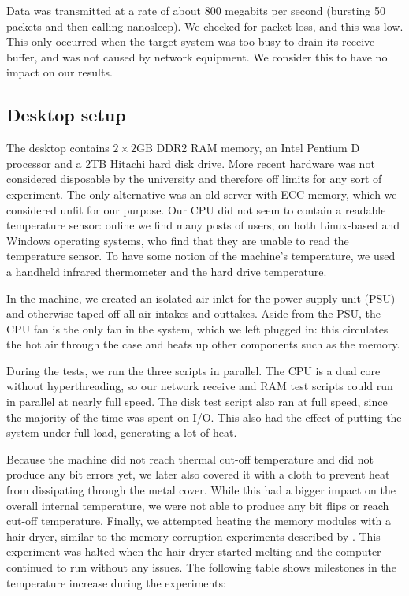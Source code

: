 \documentclass[conference]{IEEEtran}
\begin{document}
Data was transmitted at a rate of about 800 megabits per second (bursting 50
packets and then calling nanosleep). We checked for packet loss, and this was
low. This only occurred when the target system was too busy to drain its
receive buffer, and was not caused by network equipment. We consider this to
have no impact on our results.

\subsection{Desktop setup}

The desktop contains $2\times2$GB DDR2 RAM memory, an Intel Pentium D processor
and a 2TB Hitachi hard disk drive. More recent hardware was not considered
disposable by the university and therefore off limits for any sort of
experiment. The only alternative was an old server with ECC memory, which we
considered unfit for our purpose. Our CPU did not seem to contain a readable
temperature sensor: online we find many posts of users, on both Linux-based and
Windows operating systems, who find that they are unable to read the
temperature sensor. To have some notion of the machine's temperature, we used a
handheld infrared thermometer and the hard drive temperature.

In the machine, we created an isolated air inlet for the power supply unit
(PSU) and otherwise taped off all air intakes and outtakes. Aside from the PSU,
the CPU fan is the only fan in the system, which we left plugged in: this
circulates the hot air through the case and heats up other components such as
the memory.

During the tests, we run the three scripts in parallel. The CPU is a dual core
without hyperthreading, so our network receive and RAM test scripts could run
in parallel at nearly full speed. The disk test script also ran at full speed,
since the majority of the time was spent on I/O. This also had the effect of
putting the system under full load, generating a lot of heat.

Because the machine did not reach thermal cut-off temperature and did not
produce any bit errors yet, we later also covered it with a cloth to prevent
heat from dissipating through the metal cover. While this had a bigger impact
on the overall internal temperature, we were not able to produce any bit flips
or reach cut-off temperature. Finally, we attempted heating the memory modules
with a hair dryer, similar to the memory corruption experiments described by
\cite{jvm}. This experiment was halted when the hair dryer started melting and the
computer continued to run without any issues. The following table shows
milestones in the temperature increase during the experiments:
\end{document}
